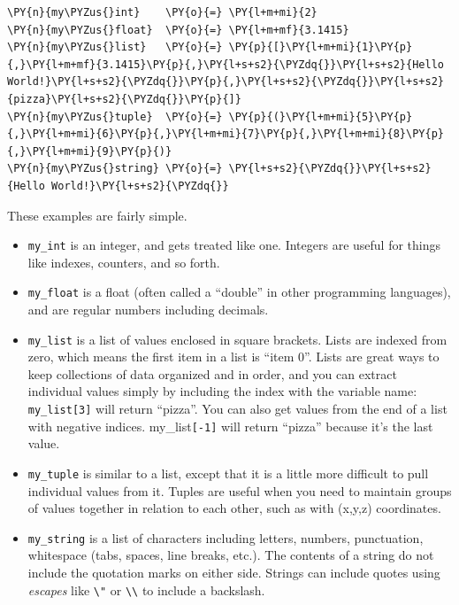     \begin{tcolorbox}[breakable, size=fbox, boxrule=1pt, pad at break*=1mm,colback=cellbackground, colframe=cellborder]
\begin{Verbatim}[commandchars=\\\{\}]
\PY{n}{my\PYZus{}int}    \PY{o}{=} \PY{l+m+mi}{2}
\PY{n}{my\PYZus{}float}  \PY{o}{=} \PY{l+m+mf}{3.1415}
\PY{n}{my\PYZus{}list}   \PY{o}{=} \PY{p}{[}\PY{l+m+mi}{1}\PY{p}{,}\PY{l+m+mf}{3.1415}\PY{p}{,}\PY{l+s+s2}{\PYZdq{}}\PY{l+s+s2}{Hello World!}\PY{l+s+s2}{\PYZdq{}}\PY{p}{,}\PY{l+s+s2}{\PYZdq{}}\PY{l+s+s2}{pizza}\PY{l+s+s2}{\PYZdq{}}\PY{p}{]}
\PY{n}{my\PYZus{}tuple}  \PY{o}{=} \PY{p}{(}\PY{l+m+mi}{5}\PY{p}{,}\PY{l+m+mi}{6}\PY{p}{,}\PY{l+m+mi}{7}\PY{p}{,}\PY{l+m+mi}{8}\PY{p}{,}\PY{l+m+mi}{9}\PY{p}{)}
\PY{n}{my\PYZus{}string} \PY{o}{=} \PY{l+s+s2}{\PYZdq{}}\PY{l+s+s2}{Hello World!}\PY{l+s+s2}{\PYZdq{}}
\end{Verbatim}
\end{tcolorbox}

    These examples are fairly simple.

\begin{itemize}
\tightlist
\item
  \texttt{my\_int} is an integer, and gets treated like one. Integers
  are useful for things like indexes, counters, and so forth.
\item
  \texttt{my\_float} is a float (often called a ``double'' in other
  programming languages), and are regular numbers including decimals.
\item
  \texttt{my\_list} is a list of values enclosed in square brackets.
  Lists are indexed from zero, which means the first item in a list is
  ``item 0''. Lists are great ways to keep collections of data organized
  and in order, and you can extract individual values simply by
  including the index with the variable name: \texttt{my\_list{[}3{]}}
  will return ``pizza''. You can also get values from the end of a list
  with negative indices. my\_list\texttt{{[}-1{]}} will return ``pizza''
  because it's the last value.
\item
  \texttt{my\_tuple} is similar to a list, except that it is a little
  more difficult to pull individual values from it. Tuples are useful
  when you need to maintain groups of values together in relation to
  each other, such as with (x,y,z) coordinates.
\item
  \texttt{my\_string} is a list of characters including letters,
  numbers, punctuation, whitespace (tabs, spaces, line breaks, etc.).
  The contents of a string do not include the quotation marks on either
  side. Strings can include quotes using \emph{escapes} like
  \texttt{\textbackslash{}"} or
  \texttt{\textbackslash{}\textbackslash{}} to include a backslash.
\end{itemize}

